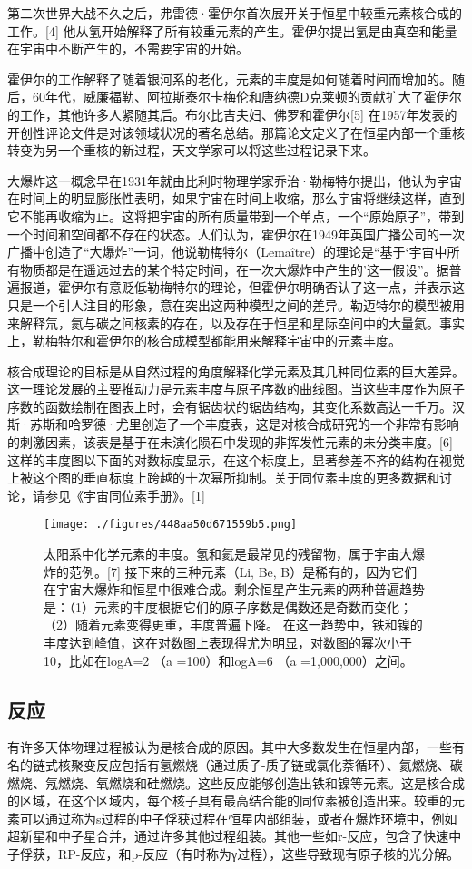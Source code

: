 第二次世界大战不久之后，弗雷德·霍伊尔首次展开关于恒星中较重元素核合成的工作。[4] 他从氢开始解释了所有较重元素的产生。霍伊尔提出氢是由真空和能量在宇宙中不断产生的，不需要宇宙的开始。

霍伊尔的工作解释了随着银河系的老化，元素的丰度是如何随着时间而增加的。随后，60年代，威廉福勒、阿拉斯泰尔卡梅伦和唐纳德D克莱顿的贡献扩大了霍伊尔的工作，其他许多人紧随其后。布尔比吉夫妇、佛罗和霍伊尔[5] 在1957年发表的开创性评论文件是对该领域状况的著名总结。那篇论文定义了在恒星内部一个重核转变为另一个重核的新过程，天文学家可以将这些过程记录下来。

大爆炸这一概念早在1931年就由比利时物理学家乔治·勒梅特尔提出，他认为宇宙在时间上的明显膨胀性表明，如果宇宙在时间上收缩，那么宇宙将继续这样，直到它不能再收缩为止。这将把宇宙的所有质量带到一个单点，一个“原始原子”，带到一个时间和空间都不存在的状态。人们认为，霍伊尔在1949年英国广播公司的一次广播中创造了“大爆炸”一词，他说勒梅特尔（Lemaître）的理论是“基于‘宇宙中所有物质都是在遥远过去的某个特定时间，在一次大爆炸中产生的’这一假设”。据普遍报道，霍伊尔有意贬低勒梅特尔的理论，但霍伊尔明确否认了这一点，并表示这只是一个引人注目的形象，意在突出这两种模型之间的差异。勒迈特尔的模型被用来解释氘，氦与碳之间核素的存在，以及存在于恒星和星际空间中的大量氦。事实上，勒梅特尔和霍伊尔的核合成模型都能用来解释宇宙中的元素丰度。

核合成理论的目标是从自然过程的角度解释化学元素及其几种同位素的巨大差异。这一理论发展的主要推动力是元素丰度与原子序数的曲线图。当这些丰度作为原子序数的函数绘制在图表上时，会有锯齿状的锯齿结构，其变化系数高达一千万。汉斯·苏斯和哈罗德·尤里创造了一个丰度表，这是对核合成研究的一个非常有影响的刺激因素，该表是基于在未演化陨石中发现的非挥发性元素的未分类丰度。[6] 这样的丰度图以下面的对数标度显示，在这个标度上，显著参差不齐的结构在视觉上被这个图的垂直标度上跨越的十次幂所抑制。关于同位素丰度的更多数据和讨论，请参见《宇宙同位素手册》。[1]
\begin{figure}[ht]
\centering
\texttt{[image: ./figures/448aa50d671559b5.png]}
\caption{太阳系中化学元素的丰度。氢和氦是最常见的残留物，属于宇宙大爆炸的范例。[7] 接下来的三种元素（Li, Be, B）是稀有的，因为它们在宇宙大爆炸和恒星中很难合成。剩余恒星产生元素的两种普遍趋势是：（1）元素的丰度根据它们的原子序数是偶数还是奇数而变化；（2）随着元素变得更重，丰度普遍下降。 在这一趋势中，铁和镍的丰度达到峰值，这在对数图上表现得尤为明显，对数图的幂次小于10，比如在logA=2 （a =100）和logA=6 （a =1,000,000）之间。} \label{fig_HHC_2}
\end{figure}

\subsection{反应}
有许多天体物理过程被认为是核合成的原因。其中大多数发生在恒星内部，一些有名的链式核聚变反应包括有氢燃烧（通过质子-质子链或氯化萘循环）、氦燃烧、碳燃烧、氖燃烧、氧燃烧和硅燃烧。这些反应能够创造出铁和镍等元素。这是核合成的区域，在这个区域内，每个核子具有最高结合能的同位素被创造出来。较重的元素可以通过称为s过程的中子俘获过程在恒星内部组装，或者在爆炸环境中，例如超新星和中子星合并，通过许多其他过程组装。其他一些如r-反应，包含了快速中子俘获，RP-反应，和p-反应（有时称为γ过程），这些导致现有原子核的光分解。

